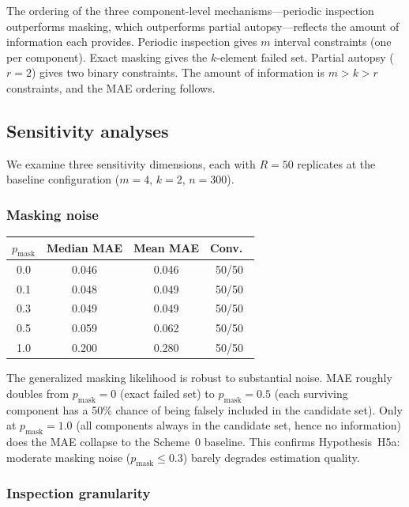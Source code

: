 \documentclass[12pt]{article}
\begin{document}
The ordering of the three component-level mechanisms---periodic inspection
outperforms masking, which outperforms partial autopsy---reflects the
amount of information each provides.  Periodic inspection gives $m$
interval constraints (one per component).  Exact masking gives the
$k$-element failed set.  Partial autopsy ($r = 2$) gives two binary
constraints.  The amount of information is $m > k > r$ constraints, and
the MAE ordering follows.

\subsection{Sensitivity analyses}\label{sec:sensitivity}

We examine three sensitivity dimensions, each with $R = 50$ replicates at
the baseline configuration ($m = 4$, $k = 2$, $n = 300$).

\subsubsection{Masking noise}\label{sec:masking-noise}

\begin{center}
\begin{tabular}{@{}cccc@{}}
\toprule
$p_\text{mask}$ & Median MAE & Mean MAE & Conv.\ \\
\midrule
0.0 & 0.046 & 0.046 & 50/50 \\
0.1 & 0.048 & 0.049 & 50/50 \\
0.3 & 0.049 & 0.049 & 50/50 \\
0.5 & 0.059 & 0.062 & 50/50 \\
1.0 & 0.200 & 0.280 & 50/50 \\
\bottomrule
\end{tabular}
\end{center}

The generalized masking likelihood is robust to substantial noise.
MAE roughly doubles from $p_{\text{mask}} = 0$ (exact failed set) to
$p_{\text{mask}} = 0.5$ (each surviving component has a 50\% chance
of being falsely included in the candidate set).  Only at
$p_{\text{mask}} = 1.0$ (all components always in the candidate set,
hence no information) does the MAE collapse to the Scheme~0 baseline.
This confirms Hypothesis~H5a: moderate masking noise ($p_{\text{mask}}
\leq 0.3$) barely degrades estimation quality.

\subsubsection{Inspection granularity}\label{sec:delta-sensitivity}
\end{document}
